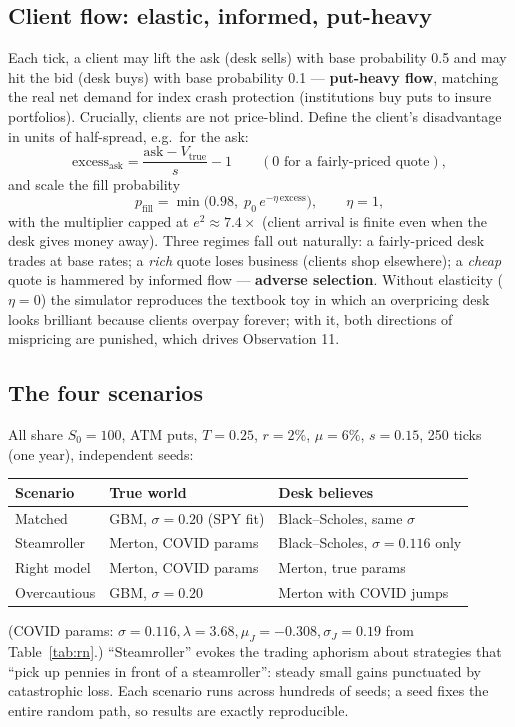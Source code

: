 \documentclass[11pt,a4paper]{article}
\begin{document}
\subsection{Client flow: elastic, informed, put-heavy}
\label{sec:flow}
Each tick, a client may lift the ask (desk sells) with base probability 0.5 and
may hit the bid (desk buys) with base probability 0.1 --- \textbf{put-heavy
flow}, matching the real net demand for index crash protection (institutions
buy puts to insure portfolios). Crucially, clients are not price-blind. Define
the client's disadvantage in units of half-spread, e.g.\ for the ask:
\begin{equation}
\text{excess}_{\text{ask}}=\frac{\text{ask}-V_{\text{true}}}{s}-1
\qquad(\text{0 for a fairly-priced quote}),
\end{equation}
and scale the fill probability
\begin{equation}
p_{\text{fill}}=\min\!\big(0.98,\;p_0\,e^{-\eta\,\text{excess}}\big),
\qquad \eta=1,
\label{eq:elastic}
\end{equation}
with the multiplier capped at $e^{2}\approx7.4\times$ (client arrival is finite
even when the desk gives money away). Three regimes fall out naturally: a
fairly-priced desk trades at base rates; a \emph{rich} quote loses business
(clients shop elsewhere); a \emph{cheap} quote is hammered by informed flow ---
\textbf{adverse selection}. Without elasticity ($\eta=0$) the simulator
reproduces the textbook toy in which an overpricing desk looks brilliant
because clients overpay forever; with it, both directions of mispricing are
punished, which drives Observation 11.

\subsection{The four scenarios}
All share $S_0=100$, ATM puts, $T=0.25$, $r=2\%$, $\mu=6\%$, $s=0.15$,
250 ticks (one year), independent seeds:
\begin{center}\small
\begin{tabular}{lll}
\toprule
Scenario & True world & Desk believes\\
\midrule
Matched & GBM, $\sigma=0.20$ (SPY fit) & Black--Scholes, same $\sigma$\\
Steamroller & Merton, COVID params & Black--Scholes, $\sigma=0.116$ only\\
Right model & Merton, COVID params & Merton, true params\\
Overcautious & GBM, $\sigma=0.20$ & Merton with COVID jumps\\
\bottomrule
\end{tabular}
\end{center}
(COVID params: $\sigma=0.116,\lambda=3.68,\mu_J=-0.308,\sigma_J=0.19$ from
Table~\ref{tab:rn}.) ``Steamroller'' evokes the trading aphorism about
strategies that ``pick up pennies in front of a steamroller'': steady small
gains punctuated by catastrophic loss. Each scenario runs across hundreds of
seeds; a seed fixes the entire random path, so results are exactly
reproducible.
\end{document}
